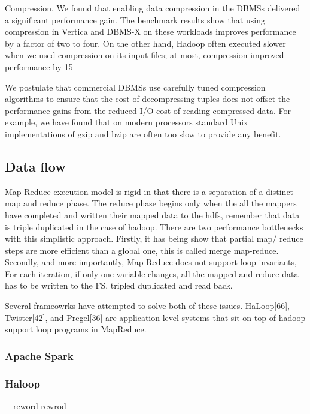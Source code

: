 \documentclass[10pt,twocolumn]{IEEEtran11}
\begin{document}
Compression. We found that enabling
data compression in the DBMSs delivered
a significant performance gain.
The benchmark results show that using
compression in Vertica and DBMS-X on
these workloads improves performance
by a factor of two to four. On the other
hand, Hadoop often executed slower
when we used compression on its input
files; at most, compression improved
performance by 15%

 We postulate that commercial
DBMSs use carefully tuned compression
algorithms to ensure that
the cost of decompressing tuples
does not offset the performance gains
from the reduced I/O cost of reading
compressed data. For example, we
have found that on modern processors
standard Unix implementations
of gzip and bzip are often too slow to
provide any benefit. 

\subsection{Data flow}

Map Reduce execution model is rigid in that there is a separation of a distinct map and reduce phase.  The reduce phase begins only when the all the mappers have completed and written their mapped data to the hdfs, remember that data is triple duplicated in the case of hadoop.  There are two performance bottlenecks with this simplistic approach.  Firstly, it has being show that partial map/ reduce steps are more efficient than a global one, this is called merge  map-reduce.  Secondly, and more importantly, Map Reduce does not support loop invariants,  For each iteration, if only one variable changes, all the mapped and reduce data has to be written to the FS, tripled duplicated and read back.
\par
Several frameowrks have attempted to solve both of these issues. HaLoop[66],
Twister[42], and Pregel[36] are application level systems that sit on top of hadoop
support loop programs in MapReduce.  

\subsubsection{Apache Spark}

\subsubsection{Haloop}

---reword rewrod
\end{document}
